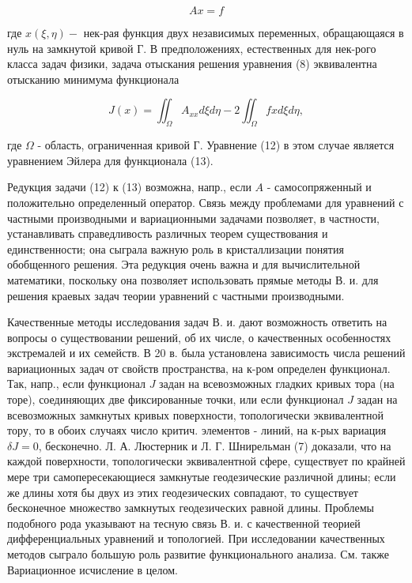 \documentclass[10pt]{article}
\begin{document}
\[

A x=f

\]



где $x(\xi, \eta)-$ нек-рая функция двух независимых переменных, обращающаяся в нуль на замкнутой кривой Г. В предположениях, естественных для нек-рого класса задач физики, задача отыскания решения уравнения (8) эквивалентна отысканию минимума функционала



\[

J(x)=\iint_{\Omega} A_{x x} d \xi d \eta-2 \iint_{\Omega} f x d \xi d \eta,

\]



где $\Omega$ - область, ограниченная кривой $Г$. Уравнение (12) в этом случае является уравнением Эйлера для функционала (13).



Редукция задачи (12) к (13) возможна, напр., если $A$ - самосопряженный и положительно определенный оператор. Связь между проблемами для уравнений с частными производными и вариационными задачами позволяет, в частности, устанавливать справедливость различных теорем существования и единственности; она сыграла важную роль в кристаллизации понятия обобщенного решения. Эта редукция очень важна и для вычислительной математики, поскольку она позволяет использовать прямые методы В. и. для решения краевых задач теории уравнений с частными производными.



Качественные методы исследования задач В. и. дают возможность ответить на вопросы о существовании решений, об их числе, о качественных особенностях экстремалей и их семейств. В 20 в. была установлена зависимость числа решений вариационных задач от свойств пространства, на к-ром определен функционал. Так, напр., если функционал $J$ задан на всевозможных гладких кривых тора (на торе), соединяющих две фиксированные точки, или если функционал $J$ задан на всевозможных замкнутых кривых поверхности, топологически эквивалентной тору, то в обоих случаях число критич. элементов - линий, на к-рых вариация $\delta J=0$, бесконечно. Л. А. Люстерник и Л. Г. Шнирельман (7) доказали, что на каждой поверхности, топологически эквивалентной сфере, существует по крайней мере три самопересекающиеся замкнутые геодезические различной длины; если же длины хотя бы двух из этих геодезических совпадают, то существует бесконечное множество замкнутых геодезических равной длины. Проблемы подобного рода указывают на тесную связь В. и. с качественной теорией дифференциальных уравнений и топологией. При исследовании качественных методов сыграло большую роль развитие функционального анализа. См. также Вариационное исчисление в целом.
\end{document}
